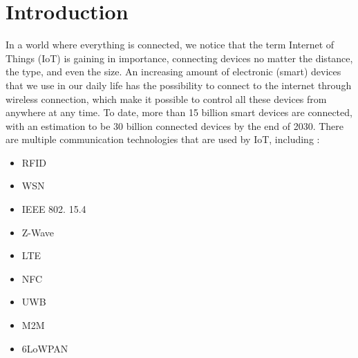 \documentclass[article,onecolumn]{IEEEtran}
\begin{document}

\newpage
\tableofcontents

\newpage
\section{Introduction}
In a world where everything is connected, we notice that the term Internet of Things (IoT) is gaining in importance, connecting devices no matter the distance, the type, and even the size. An increasing amount of electronic (smart) devices that we use in our daily life has the possibility to connect to the internet through wireless connection, which make it possible to control all these devices from anywhere at any time. To date, more than 15 billion smart devices are connected, with an estimation to be 30 billion connected devices by the end of 2030. There are multiple communication technologies that are used by IoT, including \cite{a1}:

\begin{multicols}{2} %
	\begin{center}
		\begin{itemize}
			\item RFID
			\item WSN
			\item IEEE 802. 15.4
			\item Z-Wave
			\item LTE
			\item NFC
			\item UWB
			\item M2M
			\item 6LoWPAN	
		\end{itemize}
	\end{center}
\end{multicols}
	
\end{document}
